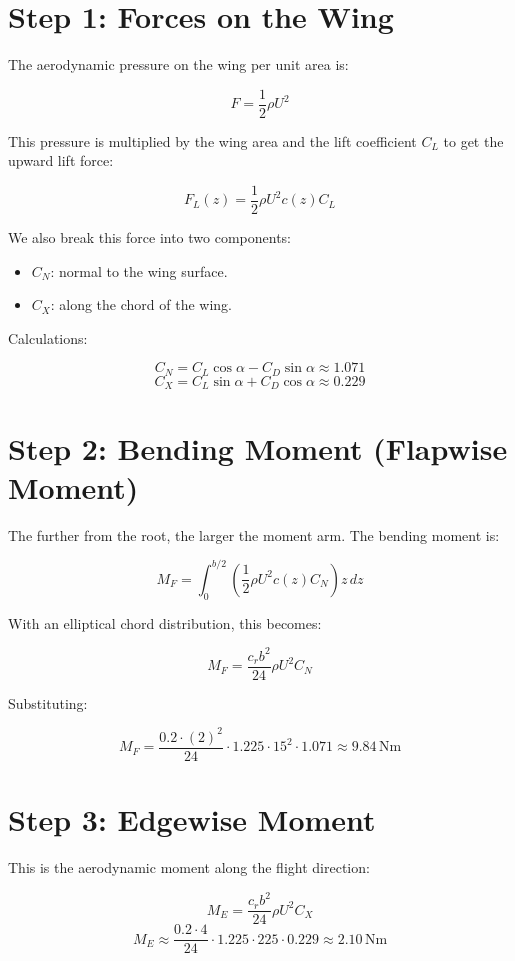 \documentclass[12pt]{article}
\begin{document}
\section*{Step 1: Forces on the Wing}

The aerodynamic pressure on the wing per unit area is:

\[
F = \frac{1}{2} \rho U^2
\]

This pressure is multiplied by the wing area and the lift coefficient $C_L$ to get the upward lift force:

\[
F_L(z) = \frac{1}{2} \rho U^2 c(z) C_L
\]

We also break this force into two components:
\begin{itemize}
    \item $C_N$: normal to the wing surface.
    \item $C_X$: along the chord of the wing.
\end{itemize}

Calculations:

\[
C_N = C_L \cos\alpha - C_D \sin\alpha \approx 1.071
\]
\[
C_X = C_L \sin\alpha + C_D \cos\alpha \approx 0.229
\]

\section*{Step 2: Bending Moment (Flapwise Moment)}

The further from the root, the larger the moment arm. The bending moment is:

\[
M_F = \int_0^{b/2} \left( \frac{1}{2} \rho U^2 c(z) C_N \right) z \, dz
\]

With an elliptical chord distribution, this becomes:

\[
M_F = \frac{c_r b^2}{24} \rho U^2 C_N
\]

Substituting:

\[
M_F = \frac{0.2 \cdot (2)^2}{24} \cdot 1.225 \cdot 15^2 \cdot 1.071 \approx \boxed{9.84 \, \text{Nm}}
\]

\section*{Step 3: Edgewise Moment}

This is the aerodynamic moment along the flight direction:

\[
M_E = \frac{c_r b^2}{24} \rho U^2 C_X
\]
\[
M_E \approx \frac{0.2 \cdot 4}{24} \cdot 1.225 \cdot 225 \cdot 0.229 \approx \boxed{2.10 \, \text{Nm}}
\]
\end{document}
